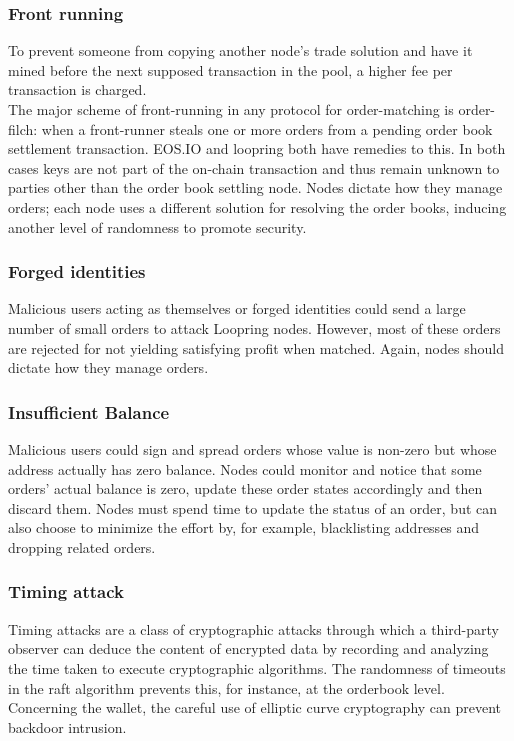 \documentclass[]{article}
\begin{document}
{		\subsubsection{Front running}
		To prevent someone from copying another node's trade solution 
		and have it mined before the next supposed transaction in the pool, 
		a higher fee per transaction is charged.\\ 
		The major scheme of front-running in any protocol for
		order-matching is order-filch: when a front-runner steals
		one or more orders from a pending order book settlement
		transaction. EOS.IO and loopring both have remedies to this.
		In both cases keys are not part of the on-chain transaction and thus remain unknown to parties other than the order book settling node.
		Nodes dictate how they manage orders;
		each node uses a different solution for resolving the order books, inducing another level of randomness to promote security.
			
		
		\subsubsection{Forged identities}
		Malicious users acting as themselves or forged identities 
		could send a large number of small orders to attack Loopring
		nodes. However, most of these orders are rejected 
		for not yielding satisfying profit when matched. 
		Again, nodes should dictate how they manage orders.
		
		\subsubsection{Insufficient Balance}
		Malicious users could sign and spread orders whose 
		value is non-zero but whose address actually has zero 
		balance. Nodes could monitor and notice that some orders' 
		actual balance is zero, update these order states accordingly
		and then discard them. Nodes must spend time to update
		the status of an order, but can also choose to minimize the
		effort by, for example, blacklisting addresses and dropping
		related orders.
		
		\subsubsection{Timing attack}
		 Timing attacks are a class of cryptographic attacks through which a third-party observer can deduce the content of encrypted data 
		 by recording and analyzing the time taken to execute cryptographic algorithms.
		 The randomness of timeouts in the raft algorithm prevents this, for instance, at the orderbook level.
		 Concerning the wallet, the careful use of elliptic curve cryptography can prevent backdoor intrusion.
		
}
\end{document}
